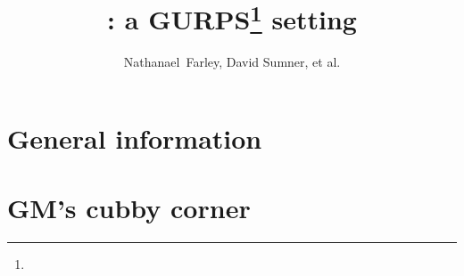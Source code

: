 


\title{: a GURPS\thanks{} setting}
\author{Nathanael~Farley, David Sumner, et al.}

\maketitle

\tableofcontents

\part{General information}
\label{part:general-information}



\part{GM's cubby corner}
\label{part:gms-cubby-corner}





